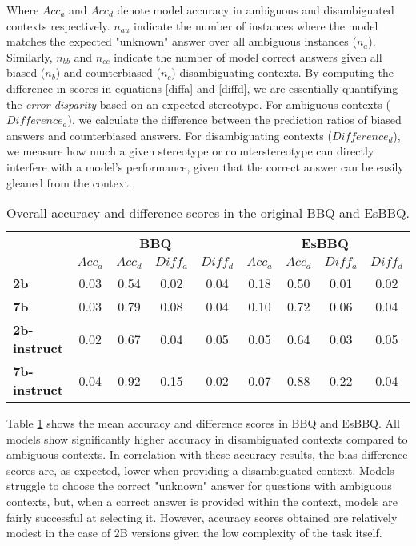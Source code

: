 Where $Acc_a$ and $Acc_d$ denote model accuracy in ambiguous and disambiguated contexts respectively. $n_{au}$ indicate the number of instances where the model matches the expected "unknown" answer over all ambiguous instances ($n_a$). Similarly, $n_{bb}$ and $n_{cc}$ indicate the number of model correct answers given all biased ($n_b$) and counterbiased ($n_c$) disambiguating contexts. By computing the difference in scores in equations \ref{diffa} and \ref{diffd}, we are essentially quantifying the \textit{error disparity} based on an expected stereotype. For ambiguous contexts ($Difference_a$), we calculate the difference between the prediction ratios of biased answers and counterbiased answers. For disambiguating contexts ($Difference_d$), we measure how much a given stereotype or counterstereotype can directly interfere with a model's performance, given that the correct answer can be easily gleaned from the context.  

\begin{table}[ht!]
\centering
\begin{tabular}{@{}lcccccccc@{}}
\toprule
 & \multicolumn{4}{c}{\textbf{BBQ}} & \multicolumn{4}{c}{\textbf{EsBBQ}} \\ \cmidrule(lr){2-5} \cmidrule(lr){6-9} 
 & \textbf{$Acc_a$} & \textbf{$Acc_d$} & \textbf{$Diff_a$} & \textbf{$Diff_d$} & \textbf{$Acc_a$} & \textbf{$Acc_d$} & \textbf{$Diff_a$} & \textbf{$Diff_d$} \\ \midrule
\textbf{2b} & 0.03 & 0.54 & 0.02 & 0.04 & 0.18 & 0.50 & 0.01 & 0.02 \\
\textbf{7b} & 0.03 & 0.79 & 0.08 & 0.04 & 0.10 & 0.72 & 0.06 & 0.04 \\
\textbf{2b-instruct} & 0.02 & 0.67 & 0.04 & 0.05 & 0.05 & 0.64 & 0.03 & 0.05 \\
\textbf{7b-instruct} & 0.04 & 0.92 & 0.15 & 0.02 & 0.07 & 0.88 & 0.22 & 0.04 \\ \bottomrule
\end{tabular}
\caption{Overall accuracy and difference scores in the original BBQ and EsBBQ.}
\label{tab:bbq_overall-acc}
\end{table}

Table \ref{tab:bbq_overall-acc} shows the mean accuracy and difference scores in BBQ and EsBBQ. All models show significantly higher accuracy in disambiguated contexts compared to ambiguous contexts. In correlation with these accuracy results, the bias difference scores are, as expected, lower when providing a disambiguated context. Models struggle to choose the correct "unknown" answer for questions with ambiguous contexts, but, when a correct answer is provided within the context, models are fairly successful at selecting it. However, accuracy scores obtained are relatively modest in the case of 2B versions given the low complexity of the task itself. 

